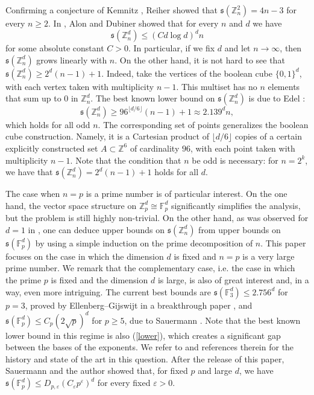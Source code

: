 \documentclass{daj}
\renewcommand{\le}{\leqslant}
\renewcommand{\ge}{\geqslant}
\newcommand{\s}{\mathfrak s}
\newcommand{\Z}{\mathbb Z}
\newcommand{\FF}{\mathbb F}
\theoremstyle{definition}
\theoremstyle{remark}
\theoremstyle{definition}
\theoremstyle{definition}
\begin{document}
Confirming a conjecture of Kemnitz \cite{Kem}, Reiher \cite{Rei} showed that $\s(\Z_n^2) = 4n-3$ for every $n \ge 2$. In \cite{AD}, Alon and Dubiner showed that for every $n$ and $d$ we have
\begin{equation}\label{adin}
    \s(\Z_n^d) \le (C d \log d)^d n
\end{equation}
for some absolute constant $C > 0$. In particular, if we fix $d$ and let $n \rightarrow \infty$, then $\s(\Z_n^d)$ grows linearly with $n$. On the other hand, it is not hard to see that $\s(\Z_n^d) \ge 2^d (n-1)+1$. Indeed, take the vertices of the boolean cube $\{0, 1\}^d$, with each vertex taken with multiplicity $n-1$. This multiset has no $n$ elements that sum up to 0 in $\Z_n^d$. 
The best known lower bound on $\s(\Z_n^d)$ is due to Edel \cite{Ed}:
\begin{equation}\label{lower}
    \s(\Z_n^d) \ge 96^{\lfloor d/6\rfloor} (n-1)+1 \approx 2.139^d n,
\end{equation}
which holds for all odd $n$. The corresponding set of points generalizes the boolean cube construction. Namely, it is a Cartesian product of $\lfloor d/6\rfloor$ copies of a certain explicitly constructed set $A \subset \Z^6$ of cardinality $96$, with each point taken with multiplicity $n-1$. Note that the condition that $n$ be odd is necessary: for $n = 2^k$, we have \cite{Har} that $\s(\Z_n^d) = 2^d(n-1)+1$ holds for all $d$.


The case when $n = p$ is a prime number is of particular interest. On the one hand, the vector space structure on $\Z_p^d \cong \FF_p^d$ significantly simplifies the analysis, but the problem is still highly non-trivial. On the other hand, as was observed for $d=1$ in \cite{EGZ}, one can deduce upper bounds on $\s(\Z_n^d)$ from upper bounds on $\s(\FF_p^d)$ by using a simple induction on the prime decomposition of $n$. 
This paper focuses on the case in which the dimension $d$ is fixed and $n= p$ is a very large prime number. We remark that the complementary case, i.e. the case in which the prime $p$ is fixed and the dimension $d$ is large, is also of great interest and, in a way, even more intriguing. 
The current best bounds are $\s(\FF_3^d) \le 2.756^d$ for $p=3$, proved by Ellenberg--Gijswijt in a breakthrough paper \cite{ElG}, and $\s(\FF_p^d) \le C_p (2 \sqrt{p})^d$ for $p \ge 5$, due to Sauermann \cite{Sau}. Note that the best known lower bound in this regime is also (\ref{lower}), which creates a significant gap between the bases of the exponents.
We refer to \cite{Sau} and references therein for the history and state of the art in this question. After the release of this paper, Sauermann and the author \cite{SauZ} showed that, for fixed $p$ and large $d$, we have $\s(\FF_p^d) \le D_{p, \varepsilon} (C_\varepsilon p^\varepsilon)^d$ for every fixed $\varepsilon>0$.
\end{document}
